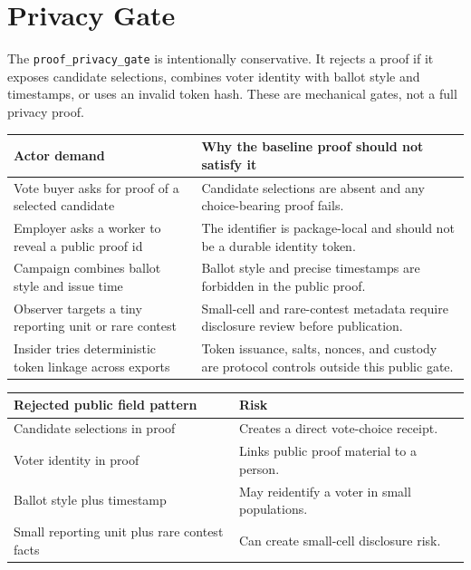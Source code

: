 \section{Privacy Gate}

The \texttt{proof\_privacy\_gate} is intentionally conservative. It rejects a
proof if it exposes candidate selections, combines voter identity with ballot
style and timestamps, or uses an invalid token hash. These are mechanical gates,
not a full privacy proof.

\begin{center}
\small
\begin{tabularx}{\textwidth}{lX}
\toprule
Actor demand & Why the baseline proof should not satisfy it \\
\midrule
Vote buyer asks for proof of a selected candidate & Candidate selections are absent and any choice-bearing proof fails. \\
Employer asks a worker to reveal a public proof id & The identifier is package-local and should not be a durable identity token. \\
Campaign combines ballot style and issue time & Ballot style and precise timestamps are forbidden in the public proof. \\
Observer targets a tiny reporting unit or rare contest & Small-cell and rare-contest metadata require disclosure review before publication. \\
Insider tries deterministic token linkage across exports & Token issuance, salts, nonces, and custody are protocol controls outside this public gate. \\
\bottomrule
\end{tabularx}
\end{center}

\begin{center}
\small
\begin{tabularx}{\textwidth}{lX}
\toprule
Rejected public field pattern & Risk \\
\midrule
Candidate selections in proof & Creates a direct vote-choice receipt. \\
Voter identity in proof & Links public proof material to a person. \\
Ballot style plus timestamp & May reidentify a voter in small populations. \\
Small reporting unit plus rare contest facts & Can create small-cell disclosure risk. \\
\bottomrule
\end{tabularx}
\end{center}

